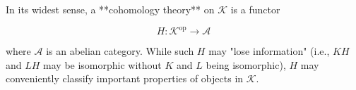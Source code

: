 In its widest sense, a **cohomology theory** on $\mathcal{K}$ is a functor

$$H: \mathcal{K}^{\text{op}} \rightarrow \mathcal{A}$$

where $\mathcal{A}$ is an abelian category. While such $H$ may "lose information" (i.e., $KH$ and $LH$ may be isomorphic without $K$ and $L$ being isomorphic), $H$ may conveniently classify important properties of objects in $\mathcal{K}$.
